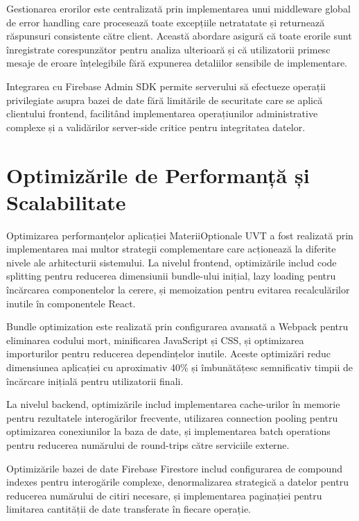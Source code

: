 \documentclass[12pt,a4paper]{report}
\begin{document}
Gestionarea erorilor este centralizată prin implementarea unui middleware global de error handling care procesează toate excepțiile netratatate și returnează răspunsuri consistente către client. Această abordare asigură că toate erorile sunt înregistrate corespunzător pentru analiza ulterioară și că utilizatorii primesc mesaje de eroare înțelegibile fără expunerea detaliilor sensibile de implementare.

Integrarea cu Firebase Admin SDK permite serverului să efectueze operații privilegiate asupra bazei de date fără limitările de securitate care se aplică clientului frontend, facilitând implementarea operațiunilor administrative complexe și a validărilor server-side critice pentru integritatea datelor.

\section{Optimizările de Performanță și Scalabilitate}

Optimizarea performanțelor aplicației MateriiOptionale UVT a fost realizată prin implementarea mai multor strategii complementare care acționează la diferite nivele ale arhitecturii sistemului. La nivelul frontend, optimizările includ code splitting pentru reducerea dimensiunii bundle-ului inițial, lazy loading pentru încărcarea componentelor la cerere, și memoization pentru evitarea recalculărilor inutile în componentele React.

Bundle optimization este realizată prin configurarea avansată a Webpack \cite{webpack} pentru eliminarea codului mort, minificarea JavaScript și CSS, și optimizarea importurilor pentru reducerea dependințelor inutile. Aceste optimizări reduc dimensiunea aplicației cu aproximativ 40\% și îmbunătățesc semnificativ timpii de încărcare inițială pentru utilizatorii finali.

La nivelul backend, optimizările includ implementarea cache-urilor în memorie pentru rezultatele interogărilor frecvente, utilizarea connection pooling pentru optimizarea conexiunilor la baza de date, și implementarea batch operations pentru reducerea numărului de round-trips către serviciile externe.

Optimizările bazei de date Firebase Firestore \cite{firestore} includ configurarea de compound indexes pentru interogările complexe, denormalizarea strategică a datelor pentru reducerea numărului de citiri necesare, și implementarea paginației pentru limitarea cantității de date transferate în fiecare operație.
\end{document}
